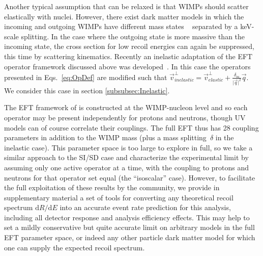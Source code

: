 	    Another typical assumption that can be relaxed is that WIMPs should scatter elastically with nuclei. However, there exist dark matter models in which the incoming and outgoing WIMPs have different mass states ~\cite{InelasticIntro} separated by a keV-scale splitting. In the case where the outgoing state is more massive than the incoming state, the cross section for low recoil energies can again be suppressed, this time by scattering kinematics. Recently an inelastic adaptation of the EFT operator framework discussed above was developed~\cite{InelasticMath}. In this case the operators presented in Eqs.~\ref{eq:OpDef} are modified such that $\vec{v}^\perp_{inelastic} = \vec{v}^\perp_{elastic} +\frac{\delta_m}{\vert{\vec{q}}\vert^2}\vec{q}$. We consider this case in section \ref{subsubsec:Inelastic}.
	    
The EFT framework of \cite{Fitzpatrick:2012ib} is constructed at the WIMP-nucleon level and so each operator may be present independently for protons and neutrons, though UV models can of course correlate their couplings. The full EFT thus has 28 coupling parameters in addition to the WIMP mass (plus a mass splitting~$\delta$ in the inelastic case). This parameter space is too large to explore in full, so we take a similar approach to the SI/SD case and characterize the experimental limit by assuming only one active operator at a time, with the coupling to protons and neutrons for that operator set equal (the ``isoscalar'' case). However, to facilitate the full exploitation of these results by the community, we provide in supplementary material a set of tools for converting any theoretical recoil spectrum $\mathrm{d}R/\mathrm{d}E$ into an accurate event rate prediction for this analysis, including all detector response and analysis efficiency effects. This may help to set a mildly conservative but quite accurate limit on arbitrary models in the full EFT parameter space, or indeed any other particle dark matter model for which one can supply the expected recoil spectrum.

